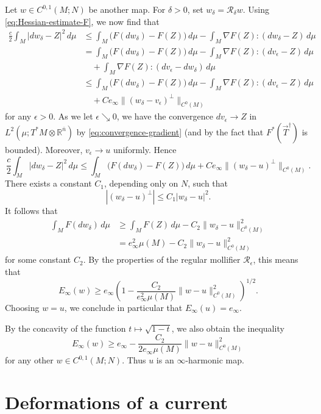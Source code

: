 \documentclass[10pt,a4paper]{amsart}
\newcommand{\R}{\mathbb{R}}
\newcommand{\ndim}{{\bar{n}}}
\begin{document}
Let $w \in C^{0, 1}(M; N)$ be another map. For $\delta > 0$, set $w_\delta = \mathcal{R}_\delta w$.
Using \eqref{eq:Hessian-estimate-F}, we now find that
\[
\begin{split}
\frac{c}{2} \int_M |dw_\delta - Z|^2 \, d\mu & \le \int_M \bigl(F(dw_\delta) - F(Z)\bigr) \, d\mu - \int_M \nabla F(Z) : (dw_\delta - Z) \, d\mu \\
& = \int_M \bigl(F(dw_\delta) - F(Z)\bigr) \, d\mu - \int_M \nabla F(Z) : (dv_\epsilon - Z) \, d\mu \\
& \quad + \int_M \nabla F(Z) : (dv_\epsilon - dw_\delta) \, d\mu\\
& \le \int_M \bigl(F(dw_\delta) - F(Z)\bigr) \, d\mu - \int_M \nabla F(Z) : (dv_\epsilon - Z) \, d\mu \\
& \quad + Ce_\infty \|(w_\delta - v_\epsilon)^\perp\|_{C^0(M)}
\end{split}
\]
for any $\epsilon > 0$. As we let $\epsilon \searrow 0$, we have the convergence
$dv_\epsilon \to Z$ in $L^2(\mu; T^*M \otimes \R^\ndim)$ by \eqref{eq:convergence-gradient} (and by the fact that $F^*(\vec{T}^\dagger)$ is bounded). Moreover, $v_\epsilon \to u$ uniformly. Hence
\[
\frac{c}{2} \int_M |dw_\delta - Z|^2 \, d\mu \le \int_M \bigl(F(dw_\delta) - F(Z)\bigr) \, d\mu + Ce_\infty \|(w_\delta - u)^\perp\|_{C^0(M)}.
\]
There exists a constant $C_1$, depending only on $N$, such that
\[
|(w_\delta - u)^\perp| \le C_1 |w_\delta - u|^2.
\]
It follows that
\[
\begin{split}
\int_M F(dw_\delta) \, d\mu & \ge \int_M F(Z) \, d\mu - C_2 \|w_\delta - u\|_{C^0(M)}^2 \\
& = e_\infty^2 \mu(M) - C_2 \|w_\delta - u\|_{C^0(M)}^2
\end{split}
\]
for some constant $C_2$.
By the properties of the regular mollifier $\mathcal{R}_\epsilon$, this means that
\[
E_\infty(w) \ge e_\infty \left(1 - \frac{C_2}{e_\infty^2 \mu(M)} \|w - u\|_{C^0(M)}^2\right)^{1/2}.
\]
Choosing $w = u$, we conclude in particular that $E_\infty(u) = e_\infty$.

By the concavity of the function $t \mapsto \sqrt{1 - t}$, we also obtain the inequality
\[
E_\infty(w) \ge e_\infty - \frac{C_2}{2e_\infty \mu(M)} \|w - u\|_{C^0(M)}^2
\]
for any other $w \in C^{0, 1}(M; N)$. Thus $u$ is an $\infty$-harmonic map.







\section{Deformations of a current} \label{sct:deformations}
\end{document}
